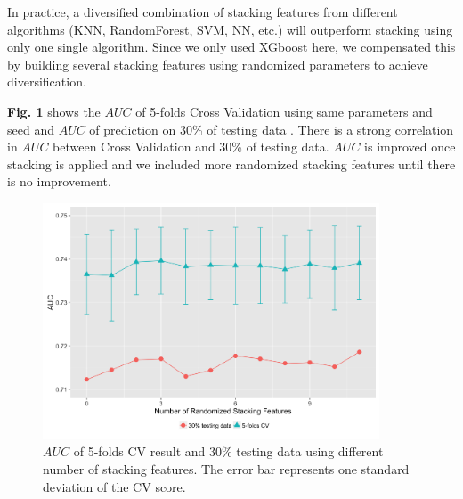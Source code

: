 \documentclass[a4paper]{llncs}
\makeatletter
\def\BState{\State\hskip-\ALG@thistlm}
\makeatother
\begin{document}
In practice, a diversified combination of stacking features from different algorithms (KNN, RandomForest, SVM, NN, etc.)
will outperform stacking using only one single algorithm.
Since we only used XGboost here, we compensated this by building several stacking features using randomized parameters to achieve diversification.


\textbf{Fig. 1} shows the $AUC$ of 5-folds Cross Validation using same parameters and seed and $AUC$ of prediction on 30\% of testing data .
 There is a strong correlation in $AUC$ between Cross Validation and 30\% of testing data.
 $AUC$ is improved once stacking is applied and we included more randomized stacking features until there is no improvement.

\begin{figure}[ht!]
\centering
\includegraphics[width=100mm]{Rplot.png}
\caption{$AUC$ of 5-folds CV result and 30\% testing data using different number of stacking features. The error bar represents one standard deviation of the CV score. \label{overflow}}
\end{figure}





\end{document}
